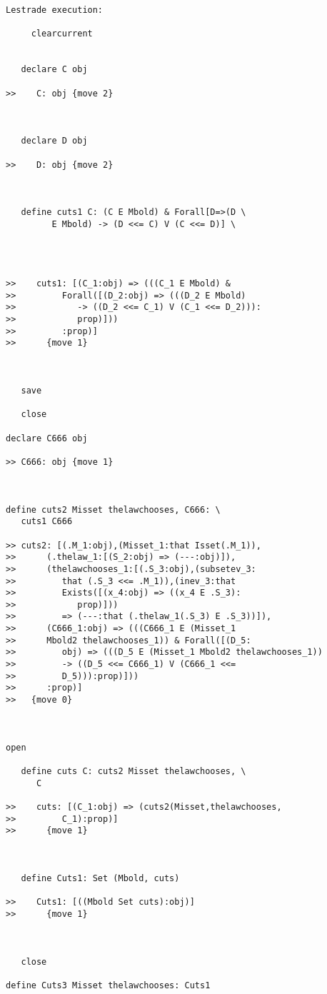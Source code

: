 \documentclass[12pt]{article}
\begin{document}
\begin{verbatim}Lestrade execution:

     clearcurrent


   declare C obj

>>    C: obj {move 2}



   declare D obj

>>    D: obj {move 2}



   define cuts1 C: (C E Mbold) & Forall[D=>(D \
         E Mbold) -> (D <<= C) V (C <<= D)] \
      



>>    cuts1: [(C_1:obj) => (((C_1 E Mbold) &
>>         Forall([(D_2:obj) => (((D_2 E Mbold)
>>            -> ((D_2 <<= C_1) V (C_1 <<= D_2))):
>>            prop)]))
>>         :prop)]
>>      {move 1}



   save

   close

declare C666 obj

>> C666: obj {move 1}



define cuts2 Misset thelawchooses, C666: \
   cuts1 C666

>> cuts2: [(.M_1:obj),(Misset_1:that Isset(.M_1)),
>>      (.thelaw_1:[(S_2:obj) => (---:obj)]),
>>      (thelawchooses_1:[(.S_3:obj),(subsetev_3:
>>         that (.S_3 <<= .M_1)),(inev_3:that
>>         Exists([(x_4:obj) => ((x_4 E .S_3):
>>            prop)]))
>>         => (---:that (.thelaw_1(.S_3) E .S_3))]),
>>      (C666_1:obj) => (((C666_1 E (Misset_1
>>      Mbold2 thelawchooses_1)) & Forall([(D_5:
>>         obj) => (((D_5 E (Misset_1 Mbold2 thelawchooses_1))
>>         -> ((D_5 <<= C666_1) V (C666_1 <<=
>>         D_5))):prop)]))
>>      :prop)]
>>   {move 0}



open

   define cuts C: cuts2 Misset thelawchooses, \
      C

>>    cuts: [(C_1:obj) => (cuts2(Misset,thelawchooses,
>>         C_1):prop)]
>>      {move 1}



   define Cuts1: Set (Mbold, cuts)

>>    Cuts1: [((Mbold Set cuts):obj)]
>>      {move 1}



   close

define Cuts3 Misset thelawchooses: Cuts1



\end{verbatim}
\end{document}
